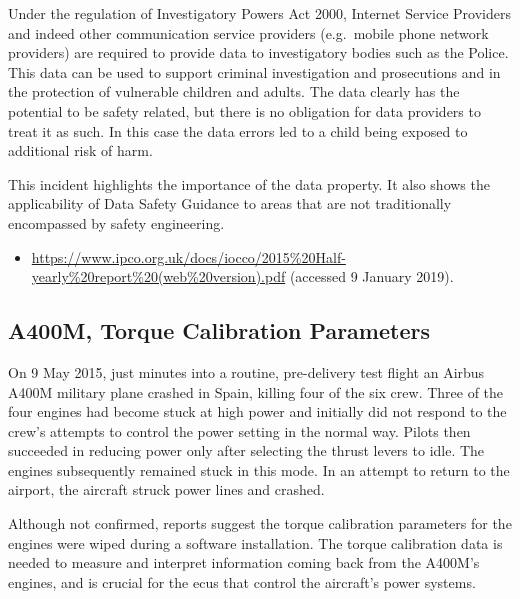 Under the regulation of Investigatory Powers Act 2000, Internet Service Providers and indeed other communication service providers (e.g.\ mobile phone network providers) are required to provide data to investigatory bodies such as the Police. This data can be used to support criminal investigation and prosecutions and in the protection of vulnerable children and adults. The data clearly has the potential to be safety related, but there is no obligation for data providers to treat it as such. In this case the \glspl{data error} led to a child being exposed to additional risk of harm.

This incident highlights the importance of the  \gls{data property}. It also shows the applicability of Data Safety Guidance to areas that are not traditionally encompassed by safety engineering.

\begin{samepage}
\begin{itemize}
  \item \raggedright{\href{https://www.ipco.org.uk/docs/iocco/2015\%20Half-yearly\%20report\%20(web\%20version).pdf}{https://www.ipco.org.uk/docs/iocco/2015\%20Half-yearly\%20report\%20(web\%20version).pdf} (accessed 9 January 2019).}
\end{itemize}
\end{samepage}


\subsection{A400M, Torque Calibration Parameters} \label{bkm:incacc:a400m}
On 9 May 2015, just minutes into a routine, pre-delivery test flight an Airbus A400M military plane crashed in Spain, killing four of the six crew. Three of the four engines had become stuck at high power and initially did not respond to the crew's attempts to control the power setting in the normal way. Pilots then succeeded in reducing power only after selecting the thrust levers to idle. The engines subsequently remained stuck in this mode. In an attempt to return to the airport, the aircraft struck power lines and crashed.  

Although not confirmed, reports suggest the torque calibration parameters for the engines were wiped during a software installation. The torque calibration data is needed to measure and interpret \gls{information} coming back from the A400M's engines, and is crucial for the \glspl{ecu} that control the aircraft's power systems. 


